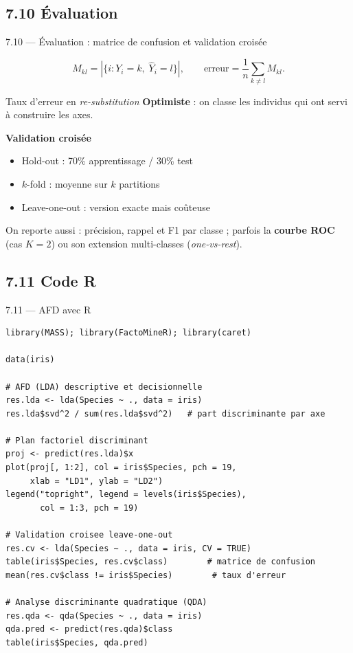 \subsection{7.10 Évaluation}
\begin{frame}{7.10 — Évaluation : matrice de confusion et validation croisée}
\begin{definition}
\[
M_{kl} = |\{i : Y_i = k,\; \hat Y_i = l\}|,
\qquad
\text{erreur} = \frac{1}{n}\sum_{k \neq l} M_{kl}.
\]
\end{definition}

\begin{block}{Taux d'erreur en \emph{re-substitution}}
\small \textbf{Optimiste} : on classe les individus qui ont servi à construire les axes.
\end{block}

\textbf{Validation croisée}
\begin{itemize}\small
  \item \alert{Hold-out} : 70\% apprentissage / 30\% test
  \item \alert{$k$-fold} : moyenne sur $k$ partitions
  \item \alert{Leave-one-out} : version exacte mais coûteuse
\end{itemize}

\begin{rema}
\small On reporte aussi : précision, rappel et F1 par classe ; parfois la
\textbf{courbe ROC} (cas $K=2$) ou son extension multi-classes (\textit{one-vs-rest}).
\end{rema}
\end{frame}

\subsection{7.11 Code R}
\begin{frame}[fragile]{7.11 — AFD avec R}
\begin{lstlisting}
library(MASS); library(FactoMineR); library(caret)

data(iris)

# AFD (LDA) descriptive et decisionnelle
res.lda <- lda(Species ~ ., data = iris)
res.lda$svd^2 / sum(res.lda$svd^2)   # part discriminante par axe

# Plan factoriel discriminant
proj <- predict(res.lda)$x
plot(proj[, 1:2], col = iris$Species, pch = 19,
     xlab = "LD1", ylab = "LD2")
legend("topright", legend = levels(iris$Species),
       col = 1:3, pch = 19)

# Validation croisee leave-one-out
res.cv <- lda(Species ~ ., data = iris, CV = TRUE)
table(iris$Species, res.cv$class)        # matrice de confusion
mean(res.cv$class != iris$Species)        # taux d'erreur

# Analyse discriminante quadratique (QDA)
res.qda <- qda(Species ~ ., data = iris)
qda.pred <- predict(res.qda)$class
table(iris$Species, qda.pred)
\end{lstlisting}
\end{frame}

